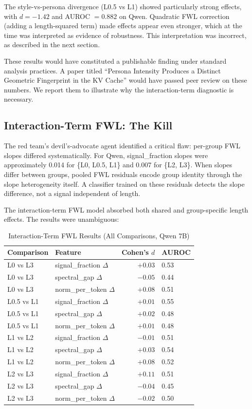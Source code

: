 \documentclass[11pt]{article}
\begin{document}
The style-vs-persona divergence (L0.5 vs L1) showed particularly strong effects, with $d = -1.42$ and AUROC $= 0.882$ on Qwen. Quadratic FWL correction (adding a length-squared term) made effects appear even stronger, which at the time was interpreted as evidence of robustness. This interpretation was incorrect, as described in the next section.

These results would have constituted a publishable finding under standard analysis practices. A paper titled ``Persona Intensity Produces a Distinct Geometric Fingerprint in the KV Cache'' would have passed peer review on these numbers. We report them to illustrate why the interaction-term diagnostic is necessary.

\subsection{Interaction-Term FWL: The Kill}
\label{sec:interaction-kill}

The red team's devil's-advocate agent identified a critical flaw: per-group FWL slopes differed systematically. For Qwen, signal\_fraction slopes were approximately 0.014 for \{L0, L0.5, L1\} and 0.007 for \{L2, L3\}. When slopes differ between groups, pooled FWL residuals encode group identity through the slope heterogeneity itself. A classifier trained on these residuals detects the slope difference, not a signal independent of length.

The interaction-term FWL model absorbed both shared and group-specific length effects. The results were unambiguous:

\begin{table}[H]
\centering
\caption{Interaction-Term FWL Results (All Comparisons, Qwen 7B)}
\label{tab:interaction-fwl}
\begin{tabular}{llrl}
\toprule
Comparison & Feature & Cohen's $d$ & AUROC \\
\midrule
L0 vs L3 & signal\_fraction $\Delta$ & $+0.03$ & 0.53 \\
L0 vs L3 & spectral\_gap $\Delta$ & $-0.05$ & 0.44 \\
L0 vs L3 & norm\_per\_token $\Delta$ & $+0.08$ & 0.51 \\
L0.5 vs L1 & signal\_fraction $\Delta$ & $+0.01$ & 0.55 \\
L0.5 vs L1 & spectral\_gap $\Delta$ & $+0.02$ & 0.48 \\
L0.5 vs L1 & norm\_per\_token $\Delta$ & $+0.01$ & 0.48 \\
L1 vs L2 & signal\_fraction $\Delta$ & $-0.01$ & 0.51 \\
L1 vs L2 & spectral\_gap $\Delta$ & $+0.03$ & 0.54 \\
L1 vs L2 & norm\_per\_token $\Delta$ & $+0.08$ & 0.52 \\
L2 vs L3 & signal\_fraction $\Delta$ & $+0.11$ & 0.51 \\
L2 vs L3 & spectral\_gap $\Delta$ & $-0.04$ & 0.45 \\
L2 vs L3 & norm\_per\_token $\Delta$ & $-0.02$ & 0.50 \\
\bottomrule
\end{tabular}
\end{table}
\end{document}

